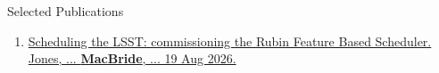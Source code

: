 \begin{rSection}{Selected Publications}
\begin{enumerate}
    \item \href{https://www.spiedigitallibrary.org/conference-proceedings-of-spie/14151/141510X/Scheduling-the-LSST-commissioning-the-Rubin-feature-based-scheduler/10.1117/12.3104048.short}{Scheduling the LSST: commissioning the Rubin Feature Based Scheduler. Jones, ... \textbf{MacBride}, ... 19 Aug 2026.}
\end{enumerate}

\end{rSection}
